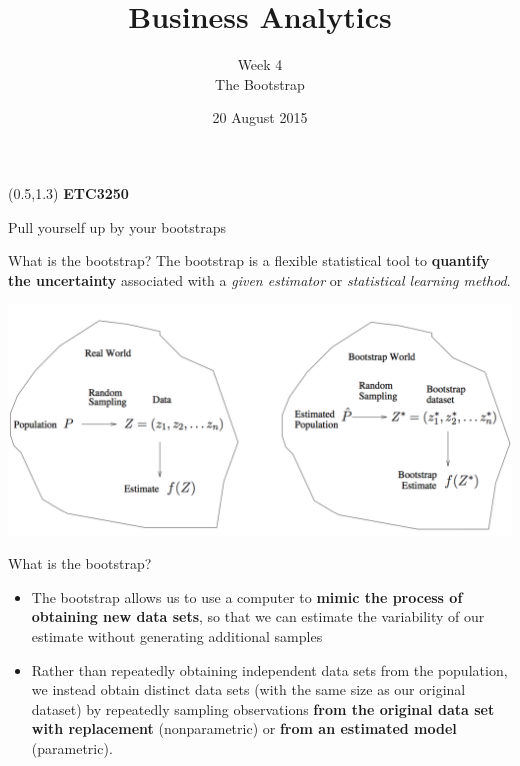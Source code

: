 \documentclass[14pt]{beamer}
\title[4. The Bootstrap]{Business Analytics}
\author{Week 4\\ The Bootstrap}
\date{20 August 2015}
\begin{document}
\begin{frame}[plain]{}
\maketitle
\begin{textblock}{11}(0.5,1.3){\color{white}\large
\textbf{ETC3250}}
\end{textblock}
\end{frame}

\begin{frame}{\large Pull yourself up by your bootstraps}
\end{frame}


\begin{frame}[plain]{What is the bootstrap?}
%
The bootstrap is a flexible statistical tool to \textbf{quantify the uncertainty} associated with a \emph{given estimator} or \emph{statistical learning method}.
\begin{center}
\includegraphics[width=1\textwidth]{general-bootstrap}	
\end{center}
\end{frame}

\begin{frame}[plain]{What is the bootstrap?}

\begin{itemize}
	\item  The bootstrap allows us to use a computer to \textbf{mimic the process of obtaining new data sets}, so that we can estimate the variability of our estimate without generating additional samples
	\item Rather than repeatedly obtaining independent data sets
from the population, we instead obtain distinct data sets (with the same size as our original dataset) by repeatedly sampling observations \textbf{from the original data set with replacement} (nonparametric) or \textbf{from an estimated model} (parametric).
\end{itemize}
\end{frame}
\end{document}
